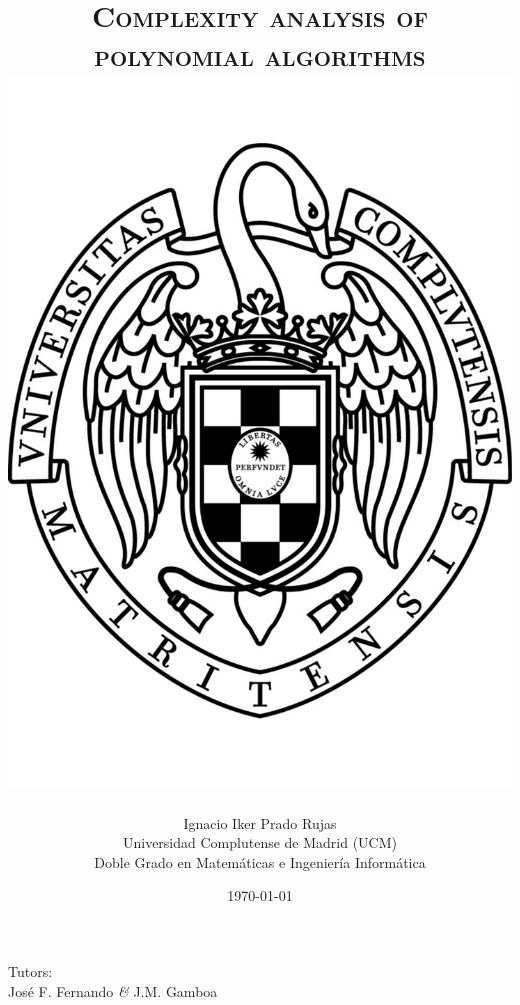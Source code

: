 \documentclass[11pt, a4paper, english, twoside, notitlepage]{report}
\begin{document}
\title{\huge{\textsc{Complexity analysis of polynomial algorithms}} \\
	\protect\includegraphics[scale=0.2]{ucm.pdf}}
\author{Ignacio Iker Prado Rujas \\
	Universidad Complutense de Madrid (UCM) \\
	Doble Grado en Matem\'aticas e Ingenier\'ia Inform\'atica}
\date{\today}
\maketitle
\begin{center}
	Tutors: \\
	Jos\'e F. Fernando \textit{\&} J.M. Gamboa \\
	\
\end{center}

\thispagestyle{empty}	
	
\end{document}
